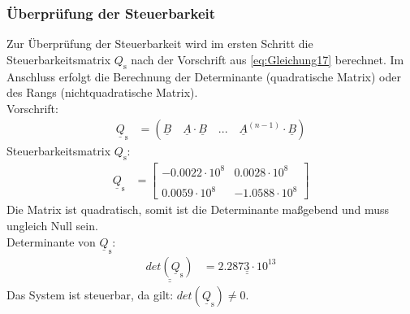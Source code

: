 \subsubsection{Überprüfung der Steuerbarkeit}
\label{sec:Ueberpruefung_der_Steuerbarkeit}
Zur Überprüfung der Steuerbarkeit wird im ersten Schritt die Steuerbarkeitsmatrix $Q_{\mathrm{s}}$ nach der Vorschrift aus \autoref{eq:Gleichung17} berechnet. Im Anschluss erfolgt die Berechnung der Determinante (quadratische Matrix) oder des Rangs (nichtquadratische Matrix).\\
\newline
Vorschrift:
\begin{align}
    \underline{Q}_{\mathrm{s}} &= \left(\underline{B} \quad \underline{A}\cdot\underline{B} \quad ... \quad \underline{A}^{(n-1)}\cdot\underline{B}\right)
    \label{eq:Gleichung17}
\end{align}
Steuerbarkeitsmatrix $Q_{\mathrm{s}}$:
\begin{align}
    \underline{Q}_{\mathrm{s}} &=
    \begin{bmatrix}
        -0.0022\cdot 10^8 & 0.0028\cdot 10^8 \\\\
        0.0059\cdot 10^8 & -1.0588\cdot 10^8
    \end{bmatrix}
    \label{eq:Gleichung18}
\end{align}
\newline
Die Matrix ist quadratisch, somit ist die Determinante maßgebend und muss ungleich Null sein.\\
\newline
Determinante von $\underline{Q}_{\mathrm{s}}$:
\begin{align*}
    \underline{\underline{det(\underline{Q}_{\mathrm{s}})}} &= \underline{\underline{ 2.2873\cdot 10^{13}}}
\end{align*}
\newline
Das System ist steuerbar, da gilt: $det(\underline{Q}_{\mathrm{s}}) \neq 0$.
